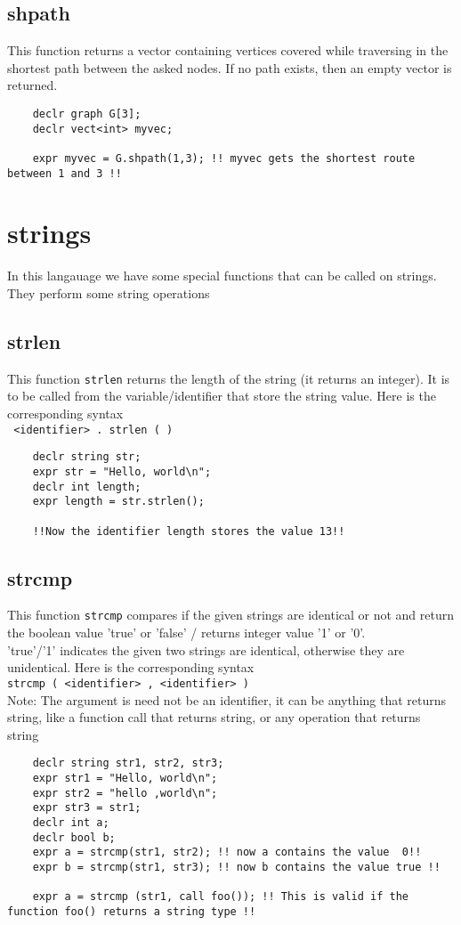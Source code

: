 \documentclass[journal, 18pt]{report}
\begin{document}
\subsection{shpath}
This function returns a vector containing vertices covered while traversing in the shortest path between the asked nodes. If no path exists, then an empty vector is returned.\\
\begin{lstlisting}
    declr graph G[3];
    declr vect<int> myvec;

    expr myvec = G.shpath(1,3); !! myvec gets the shortest route between 1 and 3 !!
\end{lstlisting}
\section{strings}
In this langauage we have some special functions that can be called on strings. They perform some string operations

\subsection{strlen}
This function \texttt{strlen} returns the length of the string (it returns an integer). It is to be called from the variable/identifier that store the string value. Here is the corresponding syntax\\
\texttt{ <identifier> . strlen ( )}
\begin{lstlisting}
    declr string str;
    expr str = "Hello, world\n";
    declr int length;
    expr length = str.strlen();

    !!Now the identifier length stores the value 13!!
\end{lstlisting}

\subsection{strcmp}
This function \texttt{strcmp} compares if the given strings are identical or not and return the boolean value 'true' or 'false' / returns integer value '1' or '0'. \\
'true'/'1' indicates the given two strings are identical, otherwise they are unidentical. Here is the corresponding syntax\\
\texttt{strcmp ( <identifier> , <identifier> )} \\
Note: The argument is need not be an identifier, it can be anything that returns string, like a function call that returns string, or any operation that returns string
\begin{lstlisting}
    declr string str1, str2, str3;
    expr str1 = "Hello, world\n";
    expr str2 = "hello ,world\n";
    expr str3 = str1;
    declr int a;
    declr bool b;
    expr a = strcmp(str1, str2); !! now a contains the value  0!!
    expr b = strcmp(str1, str3); !! now b contains the value true !!

    expr a = strcmp (str1, call foo()); !! This is valid if the function foo() returns a string type !!
\end{lstlisting}
\end{document}

